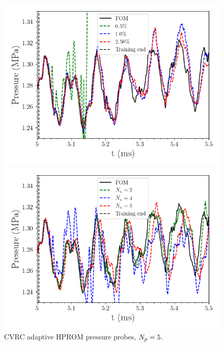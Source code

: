 \begin{figure}
    \begin{minipage}{0.49\linewidth}
        \includegraphics[width=0.99\linewidth]{Chapters/AdaptiveResults/Images/cvrc/pressure_probe_wrt_sampling.png}
    \end{minipage}
    \begin{minipage}{0.49\linewidth}
        \includegraphics[width=0.99\linewidth]{Chapters/AdaptiveResults/Images/cvrc/pressure_probe_wrt_iter.png}
    \end{minipage}
    \caption{\label{fig:cvrcAdaptiveProbes}CVRC adaptive HPROM pressure probes, $N_p = 5$.}
\end{figure}


